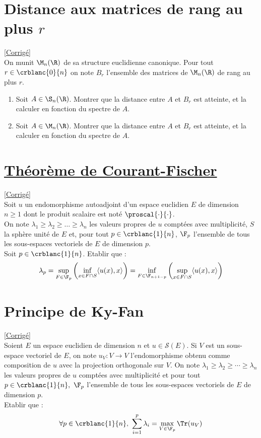 \documentclass[8pt]{book}
\begin{document}
\section{Distance aux matrices de rang au plus $r$}
\label{Distance aux matrices de rang au plus r}
\textcolor{blue}{\hyperref[Distance aux matrices de rang au plus r corrigé]{[Corrigé]}}\\
On munit $\M_n(\R)$ de sa structure euclidienne canonique. Pour tout $r\in \crblanc{0}{n}$ on note $B_r$ l'ensemble des matrices de $\M_n(\R)$ de rang au plus $r$.
\begin{enumerate}
	\item Soit $A\in \S_n(\R)$. Montrer que la distance entre $A$ et $B_r$ est atteinte, et la calculer en fonction du spectre de $A$.
	\item Soit $A\in \M_n(\R)$. Montrer que la distance entre $A$ et $B_r$ est atteinte, et la calculer en fonction du spectre de $A$.
\end{enumerate}

\section{\underline{Théorème de Courant-Fischer} }
\label{Théorème de Courant-Fischer}
\textcolor{blue}{\hyperref[Théorème de Courant-Fischer corrigé]{[Corrigé]}}\\
Soit $u$ un endomorphisme autoadjoint d'un espace euclidien $E$ de dimension $n\geq1$ dont le produit scalaire est noté $\proscal{\cdot}{\cdot}$.\\ On note $\lambda_1\geq \lambda_2\geq\dots\geq\lambda_n$ les valeurs propres de $u$ comptées avec multiplicité, $S$ la sphère unité de $E$ et, pour tout $p\in\crblanc{1}{n}$, $\F_p$ l'ensemble de tous les sous-espaces vectoriels de $E$ de dimension $p$. \\Soit $p\in\crblanc{1}{n}$. Etablir que : $$\lambda_p=\sup\limits_{F\in\F_p}\left(\inf\limits_{x\in F\cap S}\langle u(x),x\rangle\right)=\inf\limits_{F\in\F_{n+1-p}}\left(\sup\limits_{x\in F\cap S}\langle u(x),x\rangle\right)$$

\section{Principe de Ky-Fan}
\label{Principe de Ky-Fan}
\textcolor{blue}{\hyperref[Principe de Ky-Fan corrigé]{[Corrigé]}}\\
Soient $E$ un espace euclidien de dimension $n$ et $u\in \mathcal S(E)$. Si $V$ est un sous-espace vectoriel de $E$, on note $u_V:V\to V$ l'endomorphisme obtenu comme composition de $u$ avec la projection orthogonale sur $V$. On note $\lambda_1\geq \lambda_2\geq\cdots\geq\lambda_n$ les valeurs propres de $u$ comptées avec multiplicité et pour tout $p\in \crblanc{1}{n},\ \F_p$ l'ensemble de tous les sous-espaces vectoriels de $E$ de dimension $p$.\\
Etablir que : $$\forall p\in \crblanc{1}{n},\ \sum_{i=1}^p\lambda_i=\max\limits_{V\in \F_p}\Tr(u_V)$$
\end{document}
